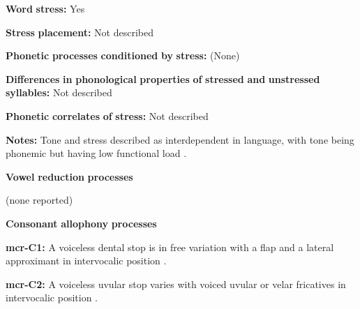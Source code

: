 \begin{styleBody}
\textbf{Word} \textbf{stress:} Yes
\end{styleBody}

\begin{styleBody}
\textbf{Stress} \textbf{placement:} Not described
\end{styleBody}

\begin{styleBody}
\textbf{Phonetic} \textbf{processes} \textbf{conditioned} \textbf{by} \textbf{stress:} (None)
\end{styleBody}

\begin{styleBody}
\textbf{Differences} \textbf{in} \textbf{phonological} \textbf{properties} \textbf{of} \textbf{stressed} \textbf{and} \textbf{unstressed} \textbf{syllables:} Not described
\end{styleBody}

\begin{styleBody}
\textbf{Phonetic} \textbf{correlates} \textbf{of} \textbf{stress:} Not described
\end{styleBody}

\begin{styleBody}
\textbf{Notes:} Tone and stress described as interdependent in language, with tone being phonemic but having low functional load \citep[226]{Whitehead2004}. 
\end{styleBody}

\begin{styleBody}
\textbf{Vowel} \textbf{reduction} \textbf{processes}
\end{styleBody}

\begin{styleBody}
(none reported)
\end{styleBody}

\begin{styleBody}
\textbf{Consonant} \textbf{allophony} \textbf{processes}
\end{styleBody}

\begin{styleBody}
\textbf{mcr-C1:} A voiceless dental stop is in free variation with a flap and a lateral approximant in intervocalic position \citep[9]{Whitehead2004}.
\end{styleBody}

\begin{styleBody}
\textbf{mcr-C2:} A voiceless uvular stop varies with voiced uvular or velar fricatives in intervocalic position \citep[9]{Whitehead2004}.
\end{styleBody}

